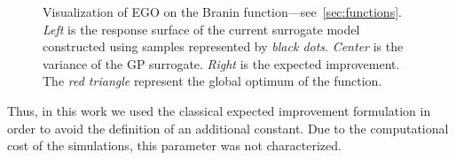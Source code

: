\begin{figure}[!h]               
\centering
{}
   
\caption{Visualization of EGO on the Branin function---see~\cref{sec:functions}. \emph{Left} is the response surface of the current surrogate model constructed using samples represented by \emph{black dots}. \emph{Center} is the variance of the GP surrogate. \emph{Right} is the expected improvement. The \emph{red triangle} represent the global optimum of the function.}
\label{fig:branin_ego}
\end{figure}

Thus, in this work we used the classical expected improvement formulation in order to avoid the definition of an additional constant. Due to the computational cost of the simulations, this parameter was not characterized.

